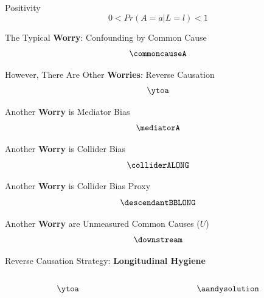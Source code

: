 \documentclass[
  ignorenonframetext,
  aspectratio=169,
]{beamer}
\begin{document}
\begin{frame}{Positivity}
\label{positivity}
\[
0 < Pr(A = a | L = l) < 1
\]
\end{frame}

\begin{frame}{The Typical \textbf{Worry}: Confounding by Common Cause}
\label{the-typical-worry-confounding-by-common-cause}
\[\commoncauseA\]
\end{frame}

\begin{frame}{However, There Are Other \textbf{Worries}: Reverse
Causation}
\label{however-there-are-other-worries-reverse-causation}
\[\ytoa\]
\end{frame}

\begin{frame}{Another \textbf{Worry} is Mediator Bias}
\label{another-worry-is-mediator-bias}
\[\mediatorA\]
\end{frame}

\begin{frame}{Another \textbf{Worry} is Collider Bias}
\label{another-worry-is-collider-bias}
\[\colliderALONG\]
\end{frame}

\begin{frame}{Another \textbf{Worry} is Collider Bias Proxy}
\label{another-worry-is-collider-bias-proxy}
\[\descendantBBLONG\]
\end{frame}


\begin{frame}{Another \textbf{Worry} are Unmeasured Common Causes
(\(U\))}
\label{another-worry-are-unmeasured-common-causes-u}
\[\downstream\]
\end{frame}

\begin{frame}{Reverse Causation Strategy: \textbf{Longitudinal Hygiene}}
\label{reverse-causation-strategy-longitudinal-hygiene}
\begin{columns}[T]
\begin{column}{0.5\textwidth}
\[\ytoa\]
\end{column}

\begin{column}{0.5\textwidth}
\[\aandysolution\]
\end{column}
\end{columns}
\end{frame}
\end{document}
